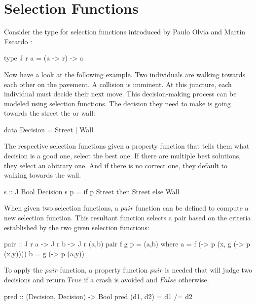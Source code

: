 \documentclass[runningheads]{llncs}
\begin{document}
\section{Selection Functions}\label{selection-functions}

Consider the type for selection functions introduced by Paulo Olvia and
Martin Escardo \cite{escardo2010selection} :

\begin{code}
type J r a = (a -> r) -> a
\end{code}

Now have a look at the following example. Two individuals are walking
towards each other on the pavement. A collision is imminent. At this
juncture, each individual must decide their next move. This
decision-making process can be modeled using selection functions. The
decision they need to make is going towards the street the or wall:

\begin{code}
data Decision = Street | Wall 
\end{code}

The respective selection functions given a property function that tells
them what decision is a good one, select the best one. If there are
multiple best solutions, they select an abitrary one. And if there is no
correct one, they default to walking towards the wall.

\begin{code}
s :: J Bool Decision
s p = if p Street then Street else Wall
\end{code}

When given two selection functions, a \(pair\) function can be defined
to compute a new selection function. This resultant function selects a
pair based on the criteria established by the two given selection
functions:

\begin{code}
pair :: J r a -> J r b -> J r (a,b)
pair f g p = (a,b)
  where
      a = f (\x -> p (x, g (\y -> p (x,y))))
      b = g (\y -> p (a,y))
\end{code}

To apply the \(pair\) function, a property function \(pair\) is needed
that will judge two decisions and return \(True\) if a crash is avoided
and \(False\) otherwise.

\begin{code}
pred :: (Decision, Decision) -> Bool
pred (d1, d2) = d1 /= d2
\end{code}
\end{document}
